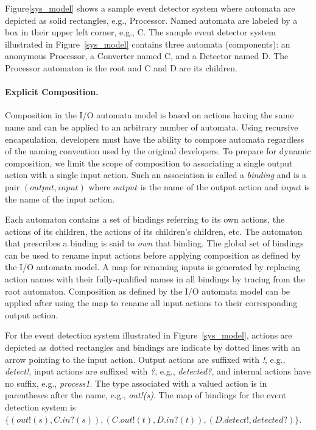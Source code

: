 Figure\ref{sys_model} shows a sample event detector system where automata are depicted as solid rectangles, e.g., Processor.
Named automata are labeled by a box in their upper left corner, e.g., C.
The sample event detector system illustrated in Figure~\ref{sys_model} contains three automata (components):  an anonymous Processor, a Converter named C, and a Detector named D.
The Processor automaton is the root and C and D are its children.

\paragraph{Explicit Composition.}
Composition in the I/O automata model is based on actions having the same name and can be applied to an arbitrary number of automata.
Using recursive encapsulation, developers must have the ability to compose automata regardless of the naming convention used by the original developers.
To prepare for dynamic composition, we limit the scope of composition to associating a single output action with a single input action.
Such an association is called a \emph{binding} and is a pair $(output, input)$ where $output$ is the name of the output action and $input$ is the name of the input action.

Each automaton contains a set of bindings referring to its own actions, the actions of its children, the actions of its children's children, etc.
The automaton that prescribes a binding is said to \emph{own} that binding.
The global set of bindings can be used to rename input actions before applying composition as defined by the I/O automata model.
A map for renaming inputs is generated by replacing action names with their fully-qualified names in all bindings by tracing from the root automaton.
Composition as defined by the I/O automata model can be applied after using the map to rename all input actions to their corresponding output action.

For the event detection system illustrated in Figure~\ref{sys_model}, actions are depicted as dotted rectangles and bindings are indicate by dotted lines with an arrow pointing to the input action.
Output actions are suffixed with \emph{!}, e.g., \emph{detect!}, input actions are suffixed with \emph{?}, e.g., \emph{detected?}, and internal actions have no suffix, e.g., \emph{process1}.
The type associated with a valued action is in parentheses after the name, e.g., \emph{out!(s)}.
The map of bindings for the event detection system is $\{ (out!(s), C.in?(s)), (C.out!(t), D.in?(t)), (D.detect!, detected?) \}$.

